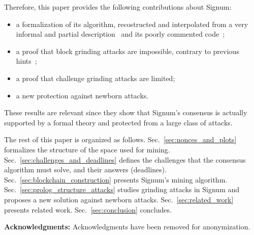 Therefore, this paper provides the following contributions about Signum:
%
\begin{itemize}
\item a formalization of its algorithm, recostructed and interpolated from a very informal and partial
  description~\cite{SignumPlotting} and its poorly commented code~\cite{SignumSource};
\item a proof that block grinding attacks are impossible, contrary to previous hints~\cite{ParkKFGAP18};
\item a proof that challenge grinding attacks are limited;
\item a new protection against newborn attacks.
\end{itemize}
%
These results are relevant since they show that Signum's consensus
is actually supported by a formal theory and
protected from a large class of attacks.

The rest of this paper is organized as follows.
Sec.~\ref{sec:nonces_and_plots} formalizes the structure of the space used for mining.
Sec.~\ref{sec:challenges_and_deadlines} defines the challenges that the consensus
algorithm must solve, and their answers (deadlines).
Sec.~\ref{sec:blockchain_construction} presents Signum's mining algorithm.
Sec.~\ref{sec:prolog_structure_attacks} studies grinding attacks
in Signum and proposes a new solution against newborn attacks.
Sec.~\ref{sec:related_work} presents related work.
Sec.~\ref{sec:conclusion} concludes.

\vspace*{1ex}
\textbf{Acknowledgments:}
Acknowledgments have been removed for anonymization.\newpage

